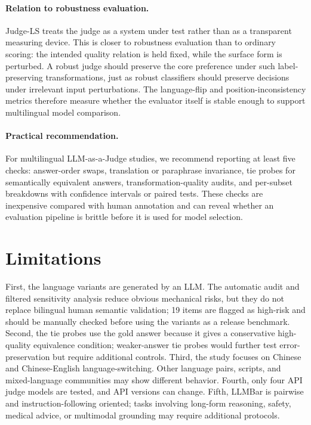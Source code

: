 \documentclass[10pt,twocolumn]{article}
\begin{document}
\paragraph{Relation to robustness evaluation.}
Judge-LS treats the judge as a system under test rather than as a transparent measuring device. This is closer to robustness evaluation than to ordinary scoring: the intended quality relation is held fixed, while the surface form is perturbed. A robust judge should preserve the core preference under such label-preserving transformations, just as robust classifiers should preserve decisions under irrelevant input perturbations. The language-flip and position-inconsistency metrics therefore measure whether the evaluator itself is stable enough to support multilingual model comparison.

\paragraph{Practical recommendation.}
For multilingual LLM-as-a-Judge studies, we recommend reporting at least five checks: answer-order swaps, translation or paraphrase invariance, tie probes for semantically equivalent answers, transformation-quality audits, and per-subset breakdowns with confidence intervals or paired tests. These checks are inexpensive compared with human annotation and can reveal whether an evaluation pipeline is brittle before it is used for model selection.

\section{Limitations}

First, the language variants are generated by an LLM. The automatic audit and filtered sensitivity analysis reduce obvious mechanical risks, but they do not replace bilingual human semantic validation; 19 items are flagged as high-risk and should be manually checked before using the variants as a release benchmark. Second, the tie probes use the gold answer because it gives a conservative high-quality equivalence condition; weaker-answer tie probes would further test error-preservation but require additional controls. Third, the study focuses on Chinese and Chinese-English language-switching. Other language pairs, scripts, and mixed-language communities may show different behavior. Fourth, only four API judge models are tested, and API versions can change. Fifth, LLMBar is pairwise and instruction-following oriented; tasks involving long-form reasoning, safety, medical advice, or multimodal grounding may require additional protocols.
\end{document}
